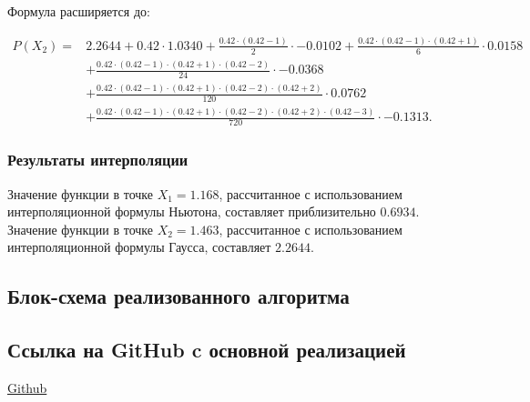 \documentclass{article}
\begin{document}
                  Формула расширяется до:

                  \[
                  \begin{aligned}
                  P(X_2) = & 2.2644 + 0.42 \cdot 1.0340 + \frac{0.42 \cdot (0.42-1)}{2} \cdot -0.0102 + \frac{0.42 \cdot (0.42-1) \cdot (0.42+1)}{6} \cdot 0.0158 \\
                        & + \frac{0.42 \cdot (0.42-1) \cdot (0.42+1) \cdot (0.42-2)}{24} \cdot -0.0368 \\
                        & + \frac{0.42 \cdot (0.42-1) \cdot (0.42+1) \cdot (0.42-2) \cdot (0.42+2)}{120} \cdot 0.0762 \\
                        & + \frac{0.42 \cdot (0.42-1) \cdot (0.42+1) \cdot (0.42-2) \cdot (0.42+2) \cdot (0.42-3)}{720} \cdot -0.1313.
                  \end{aligned}
                  \]
            \subsubsection{Результаты интерполяции}
                  
                  Значение функции в точке \( X_1 = 1.168 \), рассчитанное с использованием интерполяционной формулы Ньютона, составляет приблизительно \( 0.6934 \).
                  \\
                  Значение функции в точке \( X_2 = 1.463 \), рассчитанное с использованием интерполяционной формулы Гаусса, составляет \( 2.2644 \).
            
      \subsection{Блок-схема реализованного алгоритма}
             
      \subsection{Ссылка на GitHub c основной реализацией}
            \href{https://github.com/isofinly/compmath}{Github}
\end{document}
